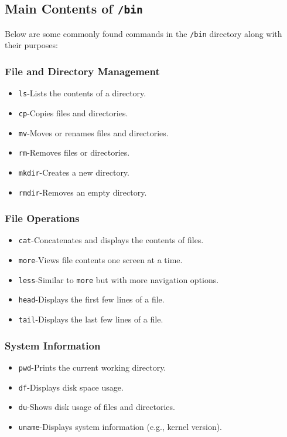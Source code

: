 \subsection*{Main Contents of \texttt{/bin}}

Below are some commonly found commands in the \texttt{/bin} directory along with their purposes:

\subsubsection*{File and Directory Management}
\begin{itemize}
    \item \texttt{ls}-Lists the contents of a directory.
    \item \texttt{cp}-Copies files and directories.
    \item \texttt{mv}-Moves or renames files and directories.
    \item \texttt{rm}-Removes files or directories.
    \item \texttt{mkdir}-Creates a new directory.
    \item \texttt{rmdir}-Removes an empty directory.
\end{itemize}

\subsubsection*{File Operations}
\begin{itemize}
    \item \texttt{cat}-Concatenates and displays the contents of files.
    \item \texttt{more}-Views file contents one screen at a time.
    \item \texttt{less}-Similar to \texttt{more} but with more navigation options.
    \item \texttt{head}-Displays the first few lines of a file.
    \item \texttt{tail}-Displays the last few lines of a file.
\end{itemize}

\subsubsection*{System Information}
\begin{itemize}
    \item \texttt{pwd}-Prints the current working directory.
    \item \texttt{df}-Displays disk space usage.
    \item \texttt{du}-Shows disk usage of files and directories.
    \item \texttt{uname}-Displays system information (e.g., kernel version).
\end{itemize}


